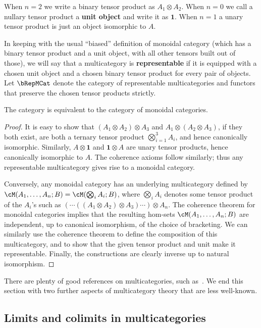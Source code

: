 \documentclass{book}
\def\one{\mathbf{1}}
\let\tensor\otimes
\let\bigtensor\bigotimes
\begin{document}
When $n=2$ we write a binary tensor product as $A_1\tensor A_2$.
When $n=0$ we call a nullary tensor product a \textbf{unit object} and write it as $\one$.
When $n=1$ a unary tensor product is just an object isomorphic to $A$.

In keeping with the usual ``biased'' definition of monoidal category (which has a binary tensor product and a unit object, with all other tensors built out of those), we will say that a multicategory is \textbf{representable} if it is equipped with a chosen unit object and a chosen binary tensor product for every pair of objects.
Let $\bRepMCat$ denote the category of representable multicategories and functors that preserve the chosen tensor products strictly.

\begin{thm}\label{thm:multicat-repr}
  The category \bRepMCat is equivalent to the category \bMonCat of monoidal categories.
\end{thm}
\begin{proof}
  It is easy to show that $(A_1\tensor A_2)\tensor A_3$ and $A_1 \tensor (A_2\tensor A_3)$, if they both exist, are both a ternary tensor product $\bigtensor_{i=1}^3 A_i$, and hence canonically isomorphic.
  Similarly, $A\tensor \one$ and $\one\tensor A$ are unary tensor products, hence canonically isomorphic to $A$.
  The coherence axioms follow similarly; thus any representable multicategory gives rise to a monoidal category.

  Conversely, any monoidal category \cM has an underlying multicategory defined by $\cM(A_1,\dots,A_n;B) = \cM(\bigtensor_i A_i;B)$, where $\bigtensor_i A_i$ denotes some tensor product of the $A_i$'s such as $(\cdots((A_1\tensor A_2)\tensor A_3)\cdots )\tensor A_n$.
  The coherence theorem for monoidal categories implies that the resulting hom-sets $\cM(A_1,\dots,A_n;B)$ are independent, up to canonical isomorphism, of the choice of bracketing.
  We can similarly use the coherence theorem to define the composition of this multicategory, and to show that the given tensor product and unit make it representable.
  Finally, the constructions are clearly inverse up to natural isomorphism.
\end{proof}

There are plenty of good references on multicategories, such as~\cite{hermida:multicats,leinster:higher-opds}.
We end this section with two further aspects of multicategory theory that are less well-known.

\subsection{Limits and colimits in multicategories}
\label{sec:lim-colim-multicat}
\end{document}
